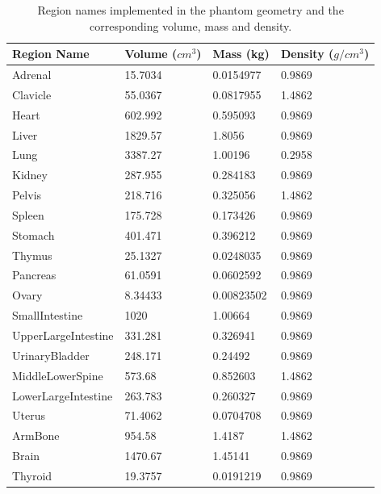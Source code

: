 \documentclass[letterpaper,12pt]{article}
\begin{document}
\begin{table}[H] 
\centering
\caption{Region names implemented in the phantom geometry and the corresponding volume, mass and density.} 
\begin{tabular}{llll} 
\hline 
\textbf{Region Name}         & \textbf{Volume ($cm^3$)}      & \textbf{Mass (kg)}   & \textbf{Density ($g/cm^3$)}                     \\\hline
Adrenal     & 15.7034      & 0.0154977     & 0.9869       \\\hline
Clavicle     & 55.0367      & 0.0817955     & 1.4862       \\\hline
Heart     & 602.992      & 0.595093     & 0.9869       \\\hline
Liver     & 1829.57      & 1.8056     & 0.9869       \\\hline
Lung     & 3387.27      & 1.00196     & 0.2958       \\\hline
Kidney     & 287.955      & 0.284183     & 0.9869       \\\hline
Pelvis     & 218.716      & 0.325056     & 1.4862       \\\hline
Spleen     & 175.728      & 0.173426     & 0.9869       \\\hline
Stomach     & 401.471      & 0.396212     & 0.9869       \\\hline
Thymus     & 25.1327      & 0.0248035     & 0.9869       \\\hline
Pancreas     & 61.0591      & 0.0602592     & 0.9869       \\\hline
Ovary     & 8.34433      & 0.00823502     & 0.9869       \\\hline
SmallIntestine     & 1020      & 1.00664     & 0.9869       \\\hline
UpperLargeIntestine     & 331.281      & 0.326941     & 0.9869       \\\hline
UrinaryBladder     & 248.171      & 0.24492     & 0.9869       \\\hline
MiddleLowerSpine     & 573.68      & 0.852603     & 1.4862       \\\hline
LowerLargeIntestine     & 263.783      & 0.260327     & 0.9869       \\\hline
Uterus     & 71.4062      & 0.0704708     & 0.9869       \\\hline
ArmBone     & 954.58      & 1.4187     & 1.4862       \\\hline
Brain     & 1470.67      & 1.45141     & 0.9869       \\\hline
Thyroid     & 19.3757      & 0.0191219     & 0.9869       \\\hline

\end{tabular}
\end{table}
\end{document}
